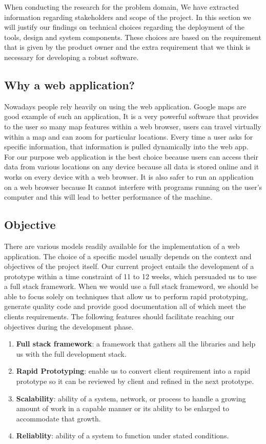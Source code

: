 When conducting the research for the problem domain, We have extracted information regarding stakeholders and scope of the project. In this section we will justify our findings on technical choices regarding the deployment of the tools, design and system components. These choices are based on the requirement that is given by the product owner and the extra requirement that we think is necessary for developing a robust software.   

\subsection{Why a web application?}
Nowadays people rely heavily on using the web application. Google maps are good example of such an application, It is a very powerful software that provides to the user so many map features within a web browser, users can travel virtually within a map and can zoom for particular locations. Every time a user asks for specific information, that information is pulled dynamically into the web app.\\
 For our purpose web application is the best choice because users can access their data from various locations on any device because all data is stored online and it works on every device with a web browser. It is also safer to run an application on a web browser because It cannot interfere with programs running on the user's computer and this will lead to better performance of the machine.

\subsection{Objective}
There are various models readily available for the implementation of a web application. The choice of a specific model usually depends on the context and objectives of the project itself. Our current project entails the development of a prototype within a time constraint of 11 to 12 weeks, which persuaded us to use a full stack framework. When we would use a full stack frameword, we should be able to focus solely on techniques that allow us to perform rapid prototyping, generate quality code and provide good documentation all of which meet the clients requirements. The following features should facilitate reaching our objectives during the development phase.

\begin{enumerate}
	\item \textbf{Full stack framework}: a framework that gathers all the libraries and help us with the full development stack.
	\item \textbf{Rapid Prototyping}: enable us to convert client requirement into a rapid prototype so it can be reviewed by client and refined in the next prototype.
	\item \textbf{Scalability}: ability of a system, network, or process to handle a growing amount of work in a capable manner or its ability to be enlarged to accommodate that growth.\cite{wiki:scalability}
	\item \textbf{Reliablity}: ability of a system to function under stated conditions.
\end{enumerate}
